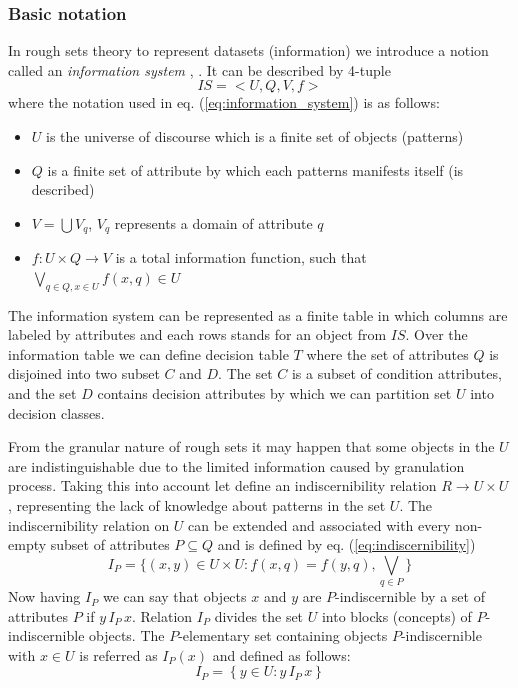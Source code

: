 \subsubsection{Basic notation}
\label{cha:Rough_set_basic_notation}
In rough sets theory to represent datasets (information) we introduce a notion 
called an \textit{information system} \cite{bib37}, \cite{bib39}. 
It can be described by 4-tuple
\begin{equation}
    IS = <U, Q, V, f >
    \label{eq:information_system}
\end{equation}
where the notation used in eq. (\ref{eq:information_system}) is as follows:
\begin{itemize}
    \item $U$ is the universe of discourse  which is a finite set of objects
        (patterns)
    \item $Q$ is a finite set of attribute by  which each patterns manifests
        itself (is described)
    \item $V = \bigcup V_q$, $V_q$ represents a domain of attribute $q$
    \item $f:U \times Q \rightarrow V$ is a total information function, such that
        $\bigvee_{q\in Q, x \in U} f(x,q) \in U$
\end{itemize} 
The information system can be represented as a finite table in which 
columns are labeled by attributes and each rows stands for an object from
$IS$. Over the information table we can define decision table
$T$ where the set of attributes $Q$ is disjoined into two
subset $C$ and $D$. The set $C$ is a subset of 
condition attributes, and the set $D$ contains decision attributes 
by which we can partition set $U$ into decision classes.

From the granular nature of rough sets it may happen that some objects 
in the $U$ are indistinguishable due to the limited information caused by
granulation process. Taking this into account let define an indiscernibility
relation $R \rightarrow U \times U$, representing the 
lack of knowledge about patterns in the set $U$. The indiscernibility relation on
$U$ can be extended and associated with every non-empty subset of attributes $P \subseteq Q$
and is defined by eq. (\ref{eq:indiscernibility})
\begin{equation}
    I_P = \{ (x, y) \in U \times U: f(x, q) = f(y,q), \bigvee_{q \in P}\}
    \label{eq:indiscernibility}
\end{equation}
Now having $I_P$ we can say that objects $x$ and
$y$ are $P$-indiscernible by a set of attributes $P$ if $y \, I_P \, x$. Relation
$I_P$ divides the set $U$ into blocks (concepts) of $P$-indiscernible objects.
The $P$-elementary set containing objects $P$-indiscernible with $x \in U$ is
referred as $I_P(x)$ and defined as follows:
\begin{equation}
    I_P = \left\{ y \in U: y \, I_P \, x \right\}
    \label{eq:p_indiscernible}
\end{equation}

